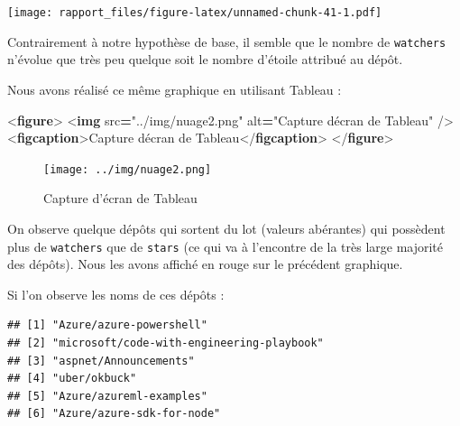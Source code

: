 \documentclass[
]{article}
\newenvironment{Shaded}{\begin{snugshade}}{\end{snugshade}}
\newcommand{\CommentTok}[1]{\textcolor[rgb]{0.56,0.35,0.01}{\textit{#1}}}
\newcommand{\DataTypeTok}[1]{\textcolor[rgb]{0.13,0.29,0.53}{#1}}
\newcommand{\FunctionTok}[1]{\textcolor[rgb]{0.13,0.29,0.53}{\textbf{#1}}}
\newcommand{\KeywordTok}[1]{\textcolor[rgb]{0.13,0.29,0.53}{\textbf{#1}}}
\newcommand{\NormalTok}[1]{#1}
\newcommand{\OperatorTok}[1]{\textcolor[rgb]{0.81,0.36,0.00}{\textbf{#1}}}
\newcommand{\OtherTok}[1]{\textcolor[rgb]{0.56,0.35,0.01}{#1}}
\newcommand{\SpecialCharTok}[1]{\textcolor[rgb]{0.81,0.36,0.00}{\textbf{#1}}}
\newcommand{\StringTok}[1]{\textcolor[rgb]{0.31,0.60,0.02}{#1}}
\begin{document}
\texttt{[image: rapport\_files/figure-latex/unnamed-chunk-41-1.pdf]}

Contrairement à notre hypothèse de base, il semble que le nombre de
\texttt{watchers} n'évolue que très peu quelque soit le nombre d'étoile
attribué au dépôt.

Nous avons réalisé ce même graphique en utilisant Tableau :

\begin{Shaded}
\begin{Highlighting}[]
\DataTypeTok{\textless{}}\KeywordTok{figure}\DataTypeTok{\textgreater{}}
  \DataTypeTok{\textless{}}\KeywordTok{img}\OtherTok{ src}\OperatorTok{=}\StringTok{"../img/nuage2.png"}\OtherTok{ alt}\OperatorTok{=}\StringTok{"Capture d\textquotesingle{}écran de Tableau"}\OtherTok{ }\DataTypeTok{/\textgreater{}}
  \DataTypeTok{\textless{}}\KeywordTok{figcaption}\DataTypeTok{\textgreater{}}\NormalTok{Capture d\textquotesingle{}écran de Tableau}\DataTypeTok{\textless{}/}\KeywordTok{figcaption}\DataTypeTok{\textgreater{}}
\DataTypeTok{\textless{}/}\KeywordTok{figure}\DataTypeTok{\textgreater{}}
\end{Highlighting}
\end{Shaded}

\begin{figure}
\centering
\texttt{[image: ../img/nuage2.png]}
\caption{Capture d'écran de Tableau}
\end{figure}

On observe quelque dépôts qui sortent du lot (valeurs abérantes) qui
possèdent plus de \texttt{watchers} que de \texttt{stars} (ce qui va à
l'encontre de la très large majorité des dépôts). Nous les avons affiché
en rouge sur le précédent graphique.

Si l'on observe les noms de ces dépôts :

\begin{Shaded}
\end{Shaded}

\begin{verbatim}
## [1] "Azure/azure-powershell"                  
## [2] "microsoft/code-with-engineering-playbook"
## [3] "aspnet/Announcements"                    
## [4] "uber/okbuck"                             
## [5] "Azure/azureml-examples"                  
## [6] "Azure/azure-sdk-for-node"
\end{verbatim}
\end{document}

